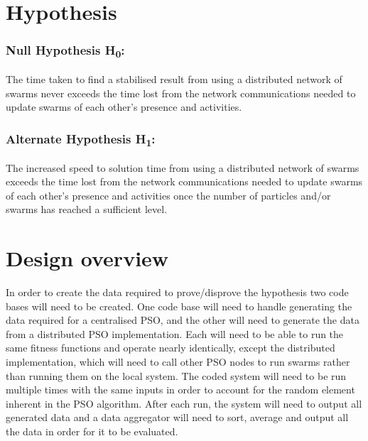 \documentclass[oneside,12pt]{book}
\begin{document}
\section{Hypothesis}
\subsubsection{Null Hypothesis H\textsubscript{0}:}
The time taken to find a stabilised result from using a distributed network of swarms never exceeds the time lost from the network communications needed to update swarms of each other's presence and activities.

\subsubsection{Alternate Hypothesis H\textsubscript{1}:}
The increased speed to solution time from using a distributed network of swarms exceeds the time lost from the network communications needed to update swarms of each other's presence and activities once the number of particles and/or swarms has reached a sufficient level.

\section{Design overview}
In order to create the data required to prove/disprove the hypothesis two code bases will need to be created. One code base will need to handle generating the data required for a centralised PSO, and the other will need to generate the data from a distributed PSO implementation. Each will need to be able to run the same fitness functions and operate nearly identically, except the distributed implementation, which will need to call other PSO nodes to run swarms rather than running them on the local system. 
The coded system will need to be run multiple times with the same inputs in order to account for the random element inherent in the PSO algorithm. After each run, the system will need to output all generated data and a data aggregator will need to sort, average and output all the data in order for it to be evaluated.
\end{document}
